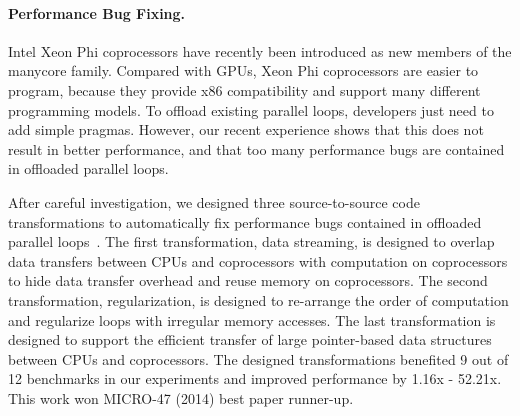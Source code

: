 \documentclass[10pt]{article}
\begin{document}
\vspace{-.1in}
\paragraph{Performance Bug Fixing.}
Intel Xeon Phi coprocessors have recently been introduced as new members of the manycore family. 
Compared with GPUs, Xeon Phi coprocessors are easier to program,
because they provide x86 compatibility and support many different programming models.
To offload existing parallel loops, developers just need to add simple pragmas. 
However, our recent experience shows that this does not result in better performance, 
and that too many performance bugs are contained in offloaded parallel loops. 

After careful investigation, we designed three source-to-source code transformations to 
automatically fix performance bugs contained in offloaded parallel loops~\cite{Song14MICRO}. 
The first transformation, data streaming, is designed to overlap data transfers between CPUs and coprocessors
with computation on coprocessors to hide data transfer overhead and reuse memory on coprocessors. 
The second transformation, regularization, is designed to re-arrange the order of computation and regularize loops with irregular memory accesses. 
The last transformation is designed to support the efficient transfer of large pointer-based data structures between CPUs and coprocessors. 
The designed transformations  benefited 9 out of 12 benchmarks in our experiments and improved performance by 1.16x - 52.21x. 
This work won MICRO-47 (2014) best paper runner-up.

\end{document}
